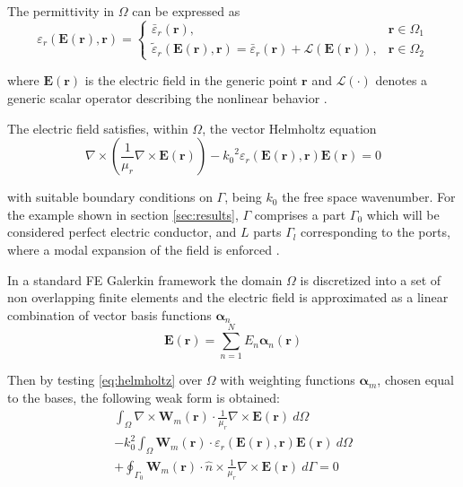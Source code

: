 \documentclass[journal]{IEEEtran}
\renewcommand{\vec}[1]{\mathbf{#1}}
\begin{document}
The permittivity in $\Omega$ can be expressed as 
%
\begin{equation}
\varepsilon_r(\vec{E}(\vec{r}),\vec{r})\!=\! 
\begin{cases}
\bar{\varepsilon}_r(\vec{r}), & \vec{r} \in \Omega_1 \\
\tilde{\varepsilon}_r(\vec{E}(\vec{r}), \vec{r}) \!=\!
\bar{\varepsilon}_r(\vec{r}) \!+\! \mathcal{L}(\vec{E}(\vec{r})), & \vec{r} \in
\Omega_2
\end{cases}
\end{equation} 

\noindent where $\vec{E}(\vec{r})$ is the electric field in the generic point
$\vec{r}$ and $\mathcal{L}(\cdot)$ denotes a generic scalar operator describing the
nonlinear behavior \cite{Guarnieri2010}. 

The electric field satisfies, within $\Omega$, the vector Helmholtz equation
%
\begin{equation}
\label{eq:helmholtz}
\nabla \times \left ( \frac{1}{\mu_r} \nabla \times \vec{E}(\vec{r}) \right )  - {k_0}^2 \varepsilon_r \left(\vec{E}(\vec{r}), \vec{r} \right) \vec{E}(\vec{r}) = 0
\end{equation} 

\noindent with suitable boundary conditions on $\Gamma$, being $k_0$ the free
space wavenumber. For the example shown in section \ref{sec:results}, $\Gamma$
comprises a part $\Gamma_0$ which will be considered perfect electric conductor, and $L$ parts $\Gamma_l$
corresponding to the ports, where a modal expansion of the field is enforced \cite{Pelosi2009}.

In a standard FE Galerkin framework the domain $\Omega$ is
discretized into a set of non overlapping finite elements and the electric
field is approximated as a linear combination of vector basis functions $\boldsymbol{\alpha}_n$
%
\begin{equation}\label{e:femexpansion}
\vec{E}(\vec{r})  = \sum_{n=1}^N E_n \boldsymbol{\alpha}_n(\vec{r})
\end{equation} 

Then by testing \eqref{eq:helmholtz} over $\Omega$ with weighting functions
 $\boldsymbol{\alpha}_m$, chosen equal to the bases, the following weak form is
 obtained:
%
\begin{multline}\label{eq:fem}
\int_\Omega \nabla \times \vec{W}_m (\vec{r}) \cdot \frac{1}{\mu_r} \nabla \times \vec{E}(\vec{r}) \ d\Omega \\
- k_0^2 \int_\Omega  \vec{W}_m (\vec{r}) \cdot \varepsilon_r (\vec{E}(\vec{r}), \vec{r}) \vec{E}(\vec{r}) \ d\Omega \\
+ \oint_{\Gamma_0} \vec{W}_m (\vec{r}) \cdot \hat{n} \times \frac{1}{\mu_r} \nabla \times \vec{E}(\vec{r}) \ d\Gamma = 0
\end{multline} 
\end{document}

